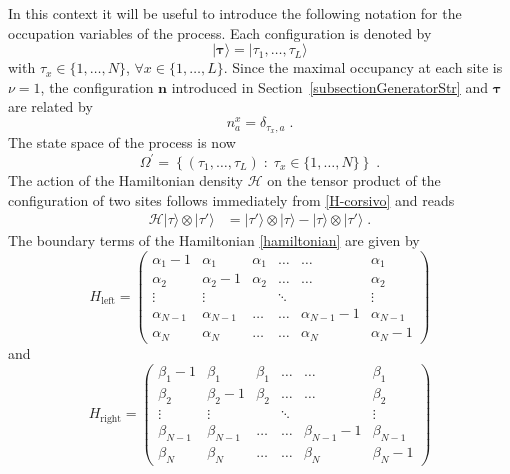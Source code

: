 \documentclass[10pt]{article}
\numberwithin{equation}{section}
\numberwithin{equation}{subsection}
\newcommand{\dt}{\;.}
\begin{document}
 In this context it will be useful to introduce the following notation for the occupation variables of the process. Each configuration is denoted by
\begin{equation}\label{Tau-Notation}
	|\bm{\tau}\rangle=|\tau_{1},\ldots,\tau_{L}\rangle
\end{equation} 
with $\tau_{x}\in \{1,\ldots,N\}$, $\forall x\in \{1,\ldots,L\}$. Since the maximal occupancy at each site is $\nu=1$,  the configuration $\bm{n}$ introduced in Section~\ref{subsectionGeneratorStr} and $\bm{\tau}$ are related by 
\begin{equation}\label{notation-change-relation}
	n_{a}^{x}=\delta_{\tau_{x},a}\dt
\end{equation}
The state space of the process is now 
\begin{equation}
	\Omega^{'}=\left\{(\tau_{1},\ldots,\tau_{L})\;:\; \tau_{x}\in\{1,\ldots,N\}\right\}\dt
\end{equation}
The action of the Hamiltonian density $\mathcal{H}$ on the tensor product of the configuration of two sites follows immediately from \eqref{H-corsivo} and reads
\begin{equation}
	\begin{split}
		\mathcal{H}| \tau\rangle\otimes   |\tau'\rangle&=|\tau'\rangle \otimes |\tau\rangle-|\tau\rangle \otimes|\tau'\rangle\dt
	\end{split}
\end{equation}
The boundary terms of the Hamiltonian \eqref{hamiltonian}  are given by 
\begin{equation}
	H_{\text{left}}=\begin{pmatrix}
		\alpha_{1}-1&\alpha_{1}&\alpha_{1}&\ldots&\ldots&\alpha_{1}\\
		\alpha_{2}&\alpha_{2}-1&\alpha_{2}&\ldots&\ldots&\alpha_{2}\\
		\vdots&\vdots& &\ddots& &\vdots\\
		\alpha_{N-1}&\alpha_{N-1}&\ldots&\ldots&\alpha_{N-1}-1&\alpha_{N-1}\\
		\alpha_{N}&\alpha_{N}&\ldots&\ldots&\alpha_{N}&\alpha_{N}-1
	\end{pmatrix}
\end{equation}
and 
\begin{equation}
	H_{\text{right}}=\begin{pmatrix}
		\beta_{1}-1&\beta_{1}&\beta_{1}&\ldots&\ldots&\beta_{1}\\
		\beta_{2}&\beta_{2}-1&\beta_{2}&\ldots&\ldots&\beta_{2}\\
		\vdots&\vdots& &\ddots& &\vdots\\
		\beta_{N-1}&\beta_{N-1}&\ldots&\ldots&\beta_{N-1}-1&\beta_{N-1}\\
		\beta_{N}&\beta_{N}&\ldots&\ldots&\beta_{N}&\beta_{N}-1
	\end{pmatrix}
\end{equation}
\end{document}

